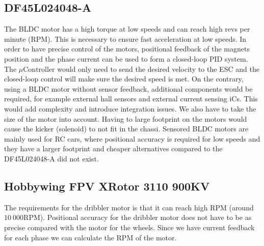 \documentclass[a4paper,12pt]{article}
\begin{document}
  \subsection*{DF45L024048-A} The BLDC motor has a high torque at low
  speeds and can reach high revs per minute (RPM). This is necessary to
  ensure fast acceleration at low speeds. In order to have precise
  control of the motors, positional feedback of the magnets position and
  the phase current can be used to form a closed-loop PID system. The
  $\mu\text{Controller}$ would only need to send the desired velocity to
  the ESC and the closed-loop control will make sure the desired speed
  is met. On the contrary, using a BLDC motor without sensor feedback,
  additional components would be required, for example external hall
  sensors and external current sensing iCs. This would add complexity
  and introduce integration issues. We also have to take the size of the
  motor into account. Having to large footprint on the motors would
  cause the kicker (solenoid) to not fit in the chassi. Sensored BLDC
  motors are mainly used for RC cars, where positional accuracy is
  required for low speeds and they have a larger footprint and cheaper
  alternatives compared to the DF45L024048-A did not exist.

  \subsection*{Hobbywing FPV XRotor 3110 900KV} The requirements for the
  dribbler motor is that it can reach high RPM (around $10\:000\text{
    RPM}$). Positional accuracy for the dribbler motor does not have to
  be as precise compared with the motor for the wheels. Since we have
  current feedback for each phase we can calculate the RPM of the motor.
\end{document}
